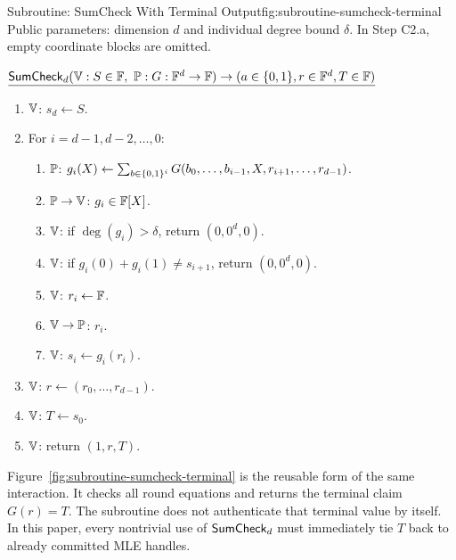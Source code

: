 \begin{protocolbox}{Subroutine: SumCheck With Terminal Output}{fig:subroutine-sumcheck-terminal}
\noindent Public parameters: dimension \(d\) and individual degree bound
\(\delta\).  In Step C2.a, empty coordinate blocks are omitted.

\smallskip
\noindent\(\underline{\SumCheck_d(\verifier:S\in\F,\ \prover:G:\F^d\to\F)\to(a\in\{0,1\},r\in\F^d,T\in\F)}\)
\begin{enumerate}[leftmargin=0.24in,label=\textbf{C\arabic*.},itemsep=0.08em,topsep=0.1em,parsep=0pt]
  \item \(\mathbb{V}\): \(s_d\gets S\).
  \item For \(i=d-1,d-2,\ldots,0\):
        \begin{enumerate}[leftmargin=0.28in,label=\textbf{C\arabic*.\alph*.},itemsep=0.05em,topsep=0.05em,parsep=0pt]
          \item \(\mathbb{P}\): \(g_i(X)\gets
                \sum_{b\in\{0,1\}^i}G(b_0,\ldots,b_{i-1},X,r_{i+1},\ldots,r_{d-1})\).
          \item \(\mathbb{P}\to\mathbb{V}\): \(g_i\in\mathbb{F}[X]\).
          \item \(\mathbb{V}\): if \(\deg(g_i)>\delta\), return
                \((0,0^d,0)\).
          \item \(\mathbb{V}\): if \(g_i(0)+g_i(1)\ne s_{i+1}\), return
                \((0,0^d,0)\).
          \item \(\mathbb{V}\): \(r_i\leftarrow\mathbb{F}\).
          \item \(\mathbb{V}\to\mathbb{P}\): \(r_i\).
          \item \(\mathbb{V}\): \(s_i\gets g_i(r_i)\).
        \end{enumerate}
  \item \(\mathbb{V}\): \(r\gets(r_0,\ldots,r_{d-1})\).
  \item \(\mathbb{V}\): \(T\gets s_0\).
  \item \(\mathbb{V}\): return \((1,r,T)\).
\end{enumerate}
\end{protocolbox}

Figure~\ref{fig:subroutine-sumcheck-terminal} is the reusable form of the same
interaction.  It checks all round equations and returns the terminal claim
\(G(r)=T\).  The subroutine does not authenticate that terminal value by
itself.  In this paper, every nontrivial use of \(\mathsf{SumCheck}_d\) must immediately
tie \(T\) back to already committed MLE handles.

